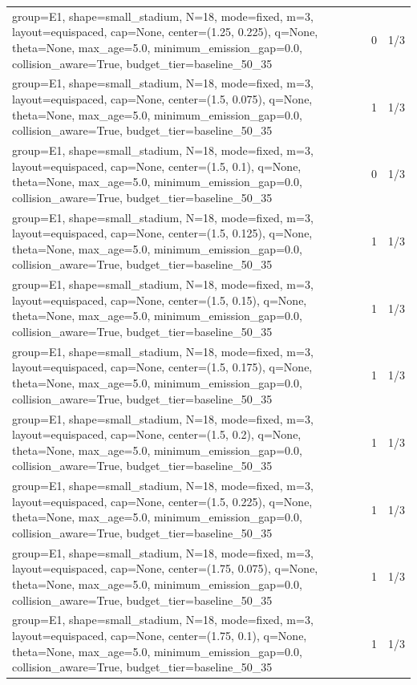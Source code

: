 \begin{tabular}{p{11cm}rr}
group=E1, shape=small\_stadium, N=18, mode=fixed, m=3, layout=equispaced, cap=None, center=(1.25, 0.225), q=None, theta=None, max\_age=5.0, minimum\_emission\_gap=0.0, collision\_aware=True, budget\_tier=baseline\_50\_35 & 0 & 1/3 \\
group=E1, shape=small\_stadium, N=18, mode=fixed, m=3, layout=equispaced, cap=None, center=(1.5, 0.075), q=None, theta=None, max\_age=5.0, minimum\_emission\_gap=0.0, collision\_aware=True, budget\_tier=baseline\_50\_35 & 1 & 1/3 \\
group=E1, shape=small\_stadium, N=18, mode=fixed, m=3, layout=equispaced, cap=None, center=(1.5, 0.1), q=None, theta=None, max\_age=5.0, minimum\_emission\_gap=0.0, collision\_aware=True, budget\_tier=baseline\_50\_35 & 0 & 1/3 \\
group=E1, shape=small\_stadium, N=18, mode=fixed, m=3, layout=equispaced, cap=None, center=(1.5, 0.125), q=None, theta=None, max\_age=5.0, minimum\_emission\_gap=0.0, collision\_aware=True, budget\_tier=baseline\_50\_35 & 1 & 1/3 \\
group=E1, shape=small\_stadium, N=18, mode=fixed, m=3, layout=equispaced, cap=None, center=(1.5, 0.15), q=None, theta=None, max\_age=5.0, minimum\_emission\_gap=0.0, collision\_aware=True, budget\_tier=baseline\_50\_35 & 1 & 1/3 \\
group=E1, shape=small\_stadium, N=18, mode=fixed, m=3, layout=equispaced, cap=None, center=(1.5, 0.175), q=None, theta=None, max\_age=5.0, minimum\_emission\_gap=0.0, collision\_aware=True, budget\_tier=baseline\_50\_35 & 1 & 1/3 \\
group=E1, shape=small\_stadium, N=18, mode=fixed, m=3, layout=equispaced, cap=None, center=(1.5, 0.2), q=None, theta=None, max\_age=5.0, minimum\_emission\_gap=0.0, collision\_aware=True, budget\_tier=baseline\_50\_35 & 1 & 1/3 \\
group=E1, shape=small\_stadium, N=18, mode=fixed, m=3, layout=equispaced, cap=None, center=(1.5, 0.225), q=None, theta=None, max\_age=5.0, minimum\_emission\_gap=0.0, collision\_aware=True, budget\_tier=baseline\_50\_35 & 1 & 1/3 \\
group=E1, shape=small\_stadium, N=18, mode=fixed, m=3, layout=equispaced, cap=None, center=(1.75, 0.075), q=None, theta=None, max\_age=5.0, minimum\_emission\_gap=0.0, collision\_aware=True, budget\_tier=baseline\_50\_35 & 1 & 1/3 \\
group=E1, shape=small\_stadium, N=18, mode=fixed, m=3, layout=equispaced, cap=None, center=(1.75, 0.1), q=None, theta=None, max\_age=5.0, minimum\_emission\_gap=0.0, collision\_aware=True, budget\_tier=baseline\_50\_35 & 1 & 1/3 \\

\end{tabular}

